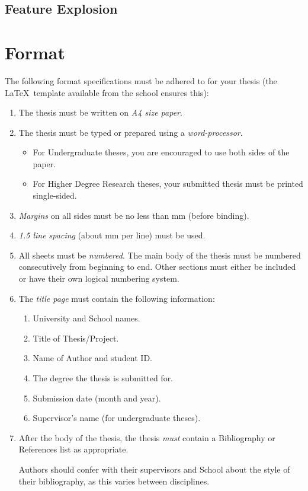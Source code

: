 \subsection{Feature Explosion}
\section{Format}
The following format specifications must be adhered to for your thesis
(the \LaTeX\ template available from the school ensures this):
\begin{enumerate}
\item The thesis must be written on \emph{A4 size paper}.
\item The thesis must be typed or prepared using a \emph{word-processor}.
\begin{itemize}
\item For Undergraduate theses, you are encouraged to use both sides
  of the paper.
\item For Higher Degree Research theses, your submitted thesis must be
   printed single-sided.
\end{itemize}
\item \emph{Margins} on all sides must be no less than \unit[20]{mm} (before
binding).
\item \emph{1.5 line spacing} (about \unit[8]{mm} per line) must be used.
\item All sheets must be \emph{numbered}. The main body of the thesis must be
numbered consecutively from beginning to end.  Other sections must either
be included or have their own logical numbering system.
\item The \emph{title page} must contain the following information:
\begin{enumerate}
\item University and School names.
\item Title of Thesis/Project.
\item Name of Author and student ID.
\item The degree the thesis is submitted for.
\item Submission date (month and year).
\item Supervisor's name (for undergraduate theses).
\end{enumerate}
\item After the body of the thesis, the thesis \emph{must} contain a
  Bibliography or References list as appropriate.

Authors should confer with their supervisors and School about the
style of their bibliography, as this varies between disciplines.
\end{enumerate}

